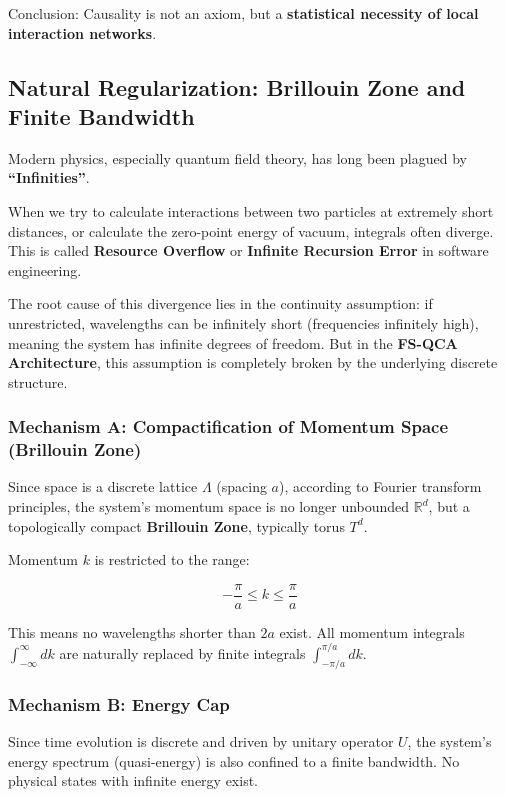 \documentclass[11pt,a4paper,twoside]{book}
\begin{document}
Conclusion: Causality is not an axiom, but a \textbf{statistical necessity of local interaction networks}.

\subsection{Natural Regularization: Brillouin Zone and Finite Bandwidth}

Modern physics, especially quantum field theory, has long been plagued by \textbf{``Infinities''}.

When we try to calculate interactions between two particles at extremely short distances, or calculate the zero-point energy of vacuum, integrals often diverge. This is called \textbf{Resource Overflow} or \textbf{Infinite Recursion Error} in software engineering.

The root cause of this divergence lies in the continuity assumption: if unrestricted, wavelengths can be infinitely short (frequencies infinitely high), meaning the system has infinite degrees of freedom. But in the \textbf{FS-QCA Architecture}, this assumption is completely broken by the underlying discrete structure.

\subsubsection{Mechanism A: Compactification of Momentum Space (Brillouin Zone)}

Since space is a discrete lattice \textbf{$\Lambda$} (spacing \textbf{$a$}), according to Fourier transform principles, the system's momentum space is no longer unbounded \textbf{$\mathbb{R}^d$}, but a topologically compact \textbf{Brillouin Zone}, typically torus \textbf{$T^d$}.

Momentum \textbf{$k$} is restricted to the range:

$$-\frac{\pi}{a} \le k \le \frac{\pi}{a}$$

This means no wavelengths shorter than \textbf{$2a$} exist. All momentum integrals \textbf{$\int_{-\infty}^{\infty} dk$} are naturally replaced by finite integrals \textbf{$\int_{-\pi/a}^{\pi/a} dk$}.

\subsubsection{Mechanism B: Energy Cap}

Since time evolution is discrete and driven by unitary operator \textbf{$U$}, the system's energy spectrum (quasi-energy) is also confined to a finite bandwidth. No physical states with infinite energy exist.
\end{document}
